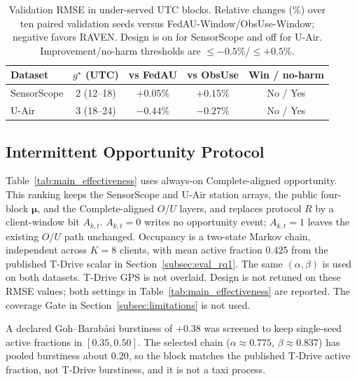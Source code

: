\begin{table}[!htbp]
\centering
\caption{Validation RMSE in under-served UTC blocks.
Relative changes (\%) over ten paired validation seeds versus
FedAU-Window/ObsUse-Window; negative favors RAVEN.
Design is on for SensorScope and off for U-Air.
Improvement/no-harm thresholds are $\le-0.5\%$/$\le+0.5\%$.}
\label{tab:underserved_block}
\setlength{\tabcolsep}{3.5pt}
\begin{tabular}{lcccc}
\toprule
Dataset & $g^{\star}$ (UTC) & vs FedAU & vs ObsUse & Win / no-harm\\
\midrule
SensorScope & 2 (12--18) & $+0.05\%$ & $+0.15\%$ & No / Yes\\
U-Air & 3 (18--24) & $-0.44\%$ & $-0.27\%$ & No / Yes\\
\bottomrule
\end{tabular}
\end{table}











\subsection{Intermittent Opportunity Protocol}




Table~\ref{tab:main_effectiveness} uses always-on Complete-aligned opportunity.
This ranking keeps the SensorScope and U-Air station arrays, the public
four-block $\boldsymbol\mu$, and the Complete-aligned $O$/$U$ layers, and
replaces protocol $R$ by a client-window bit $A_{k,t}$. $A_{k,t}=0$ writes
no opportunity event; $A_{k,t}=1$ leaves the existing $O$/$U$ path unchanged.
Occupancy is a two-state Markov chain, independent across $K=8$ clients, with
mean active fraction $0.425$ from the published T-Drive scalar in
Section~\ref{subsec:eval_rq1}. The same $(\alpha,\beta)$ is used on both
datasets. T-Drive GPS is not overlaid. Design is not retuned on these RMSE
values; both settings in Table~\ref{tab:main_effectiveness} are reported. The
coverage Gate in Section~\ref{subsec:limitations} is not used.

A declared Goh--Barab\'asi burstiness of $+0.38$ was screened to keep
single-seed active fractions in $[0.35,0.50]$. The selected chain
($\alpha\approx0.775$, $\beta\approx0.837$) has pooled burstiness about
$0.20$, so the block matches the published T-Drive active fraction, not
T-Drive burstiness, and it is not a taxi process.

